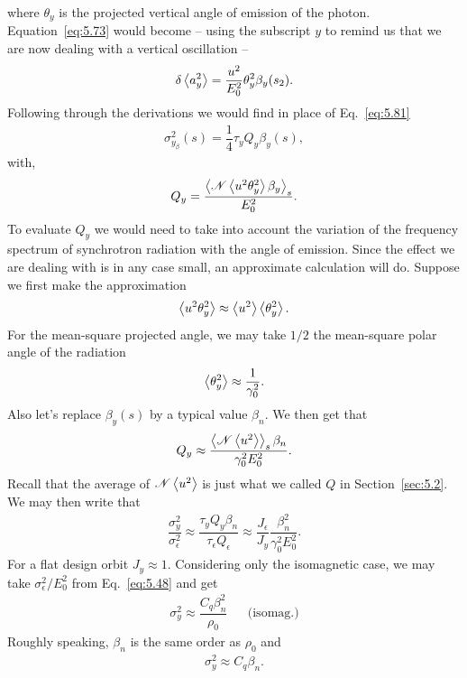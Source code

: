 where $\theta_y$ is the projected vertical angle of emission of the photon. Equation~\eqref{eq:5.73} would become -- using the subscript $y$ to remind us that we are now dealing with a vertical oscillation --
\begin{align}
	\delta\left< a_y^2 \right> = \dfrac{u^2}{E_0^2} \theta_y^2 \beta_y (s_2).
\end{align}
Following through the derivations we would find in place of Eq.~\eqref{eq:5.81}
\begin{align}
	\sigma_{y_\beta}^2(s) = \dfrac{1}{4} \tau_y Q_y \beta_y(s),
\end{align}
with,
\begin{align}
	Q_y = \dfrac{\left< \mathscr{N}\left< u^2 \theta_y^2 \right>\beta_y \right>_s}{E_0^2}.
\end{align}
To evaluate $Q_y$ we would need to take into account the variation of the frequency spectrum of synchrotron radiation with the angle of emission. Since the effect we are dealing with is in any case small, an approximate calculation will do. Suppose we first make the approximation
\begin{align}
	\left< u^2 \theta_y^2 \right> \approx \left< u^2 \right>\left< \theta_y^2 \right>.
\end{align}
For the mean-square projected angle, we may take $1/2$ the mean-square polar angle of the radiation
\begin{align}
	\left< \theta_y^2 \right> \approx \dfrac{1}{\gamma_0^2}.
\end{align}
Also let's replace $\beta_y(s)$ by a typical value $\beta_n$. We then get that
\begin{align}
	Q_y \approx \dfrac{\left< \mathscr{N}\left< u^2 \right> \right>_s\beta_n}{\gamma_0^2 E_0^2}.
\end{align}
Recall that the average of $\mathscr{N}\left< u^2 \right>$ is just what we called $Q$ in Section~\ref{sec:5.2}. We may then write that
\begin{align}
	\dfrac{\sigma_y^2}{\sigma_\epsilon^2} \approx \dfrac{\tau_y Q_y \beta_n}{\tau_\epsilon Q_\epsilon} \approx \dfrac{J_\epsilon}{J_y} \dfrac{\beta_n^2}{\gamma_0^2 E_0^2}.
\end{align}
For a flat design orbit $J_y \approx 1$. Considering only the isomagnetic case, we may take $\sigma_\epsilon^2/E_0^2$ from Eq.~\eqref{eq:5.48} and get
\begin{align} \label{eq:5.107}
	\sigma_y^2 \approx \dfrac{C_q \beta_n^2}{\rho_0} && \text{(isomag.)}
\end{align}
Roughly speaking, $\beta_n$ is the same order as $\rho_0$ and
\begin{align}
	\sigma_y^2 \approx C_q \beta_n.
\end{align}
